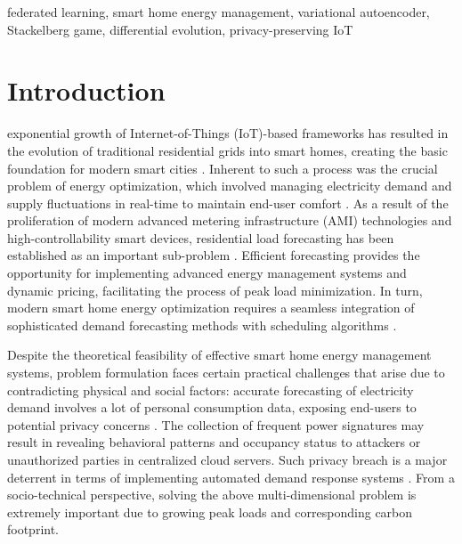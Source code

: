 \documentclass[journal]{IEEEtran}
\begin{document}
\begin{IEEEkeywords}
federated learning, smart home energy management, variational autoencoder, Stackelberg game, differential evolution, privacy-preserving IoT
\end{IEEEkeywords}

\IEEEpeerreviewmaketitle

\section{Introduction}

 exponential growth of Internet-of-Things (IoT)-based frameworks has resulted in the evolution of traditional residential grids into smart homes, creating the basic foundation for modern smart cities \cite{alfaverh2020demand, alzamil2025federated}. Inherent to such a process was the crucial problem of energy optimization, which involved managing electricity demand and supply fluctuations in real-time to maintain end-user comfort \cite{zhang2025demand}. As a result of the proliferation of modern advanced metering infrastructure (AMI) technologies and high-controllability smart devices, residential load forecasting has been established as an important sub-problem \cite{wang2025multi-gradient-descent}. Efficient forecasting provides the opportunity for implementing advanced energy management systems and dynamic pricing, facilitating the process of peak load minimization. In turn, modern smart home energy optimization requires a seamless integration of sophisticated demand forecasting methods with scheduling algorithms \cite{aguiar2021network-constrained}.

Despite the theoretical feasibility of effective smart home energy management systems, problem formulation faces certain practical challenges that arise due to contradicting physical and social factors: accurate forecasting of electricity demand involves a lot of personal consumption data, exposing end-users to potential privacy concerns \cite{wang2024blockchain-based, fan2025adaptive}. The collection of frequent power signatures may result in revealing behavioral patterns and occupancy status to attackers or unauthorized parties in centralized cloud servers. Such privacy breach is a major deterrent in terms of implementing automated demand response systems \cite{balint2023using}. From a socio-technical perspective, solving the above multi-dimensional problem is extremely important due to growing peak loads and corresponding carbon footprint.
\end{document}
